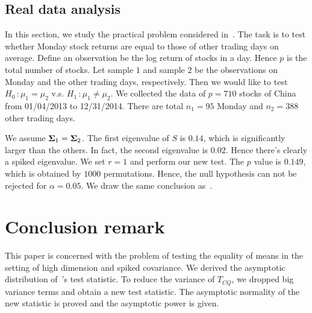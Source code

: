 \documentclass[review]{elsarticle}
\theoremstyle{plain}
\theoremstyle{definition}
\theoremstyle{remark}
\begin{document}

\subsection{Real data analysis}
In this section, we study the practical problem considered in~\cite{Ma2015A}.
The task is to test whether Monday stock returns are equal to those of other trading days on average.
Define an observation be the log return of stocks in a day.
Hence $p$ is the total number of stocks.
Let sample $1$ and sample $2$ be the observations on Monday and the other trading days, respectively.
Then we would like to test $H_0\, :\mu_1=\mu_2$ v.s. $H_1\,:\mu_1\neq \mu_2$.
We collected the data of $p=710$
 stocks of China
from 01/04/2013 to 12/31/2014. There are total $n_1=95$ Monday and $n_2=388$ other trading days. 

We assume $\boldsymbol{\Sigma}_1=\boldsymbol{\Sigma}_2$.
The first eigenvalue of $S$ is $0.14$, which is significantly larger than the others.
In fact, the second eigenvalue is $0.02$.
Hence there's clearly a spiked eigenvalue.
We set $r=1$ and perform our new test.
The $p$ value is $0.149$, which is obtained by $1000$ permutations.
Hence, the null hypothesis can not be rejected for $\alpha=0.05$.
We draw the same conclusion as~\cite{Ma2015A}.

\section{Conclusion remark}



This paper is concerned with the problem of testing the equality of means in the setting of high dimension and spiked covariance.
We derived the asymptotic distribution of~\cite{Chen2010A}'s test statistic.
To reduce the variance of $T_{CQ}$, we dropped big variance terms and obtain a new test statistic. The asymptotic normality of the new statistic is proved and the asymptotic power is given. %
\end{document}
